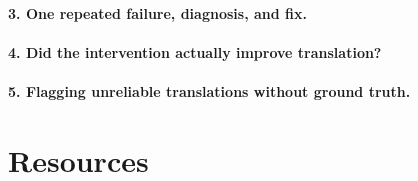 \documentclass[11pt]{article}
\begin{document}
\paragraph{3. One repeated failure, diagnosis, and fix.}
%

\paragraph{4. Did the intervention actually improve translation?}
%

\paragraph{5. Flagging unreliable translations without ground truth.}
%

\section*{Resources}


\end{document}
